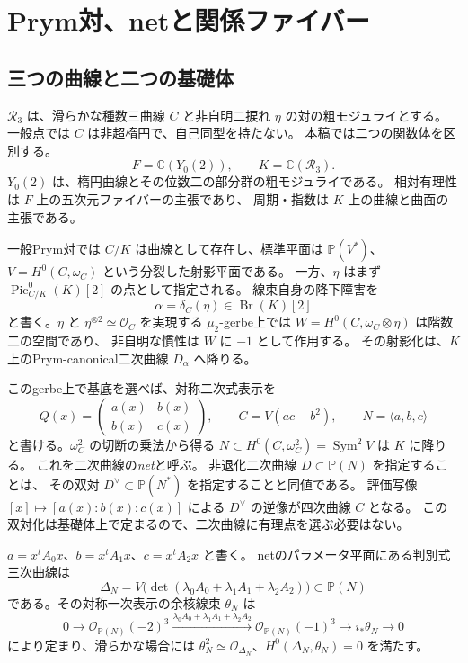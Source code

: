 \section{Prym対、netと関係ファイバー}
\label{sec:vi-setup-v28}

\subsection{三つの曲線と二つの基礎体}

$\mathcal R_3$ は、滑らかな種数三曲線 $C$ と非自明二捩れ
$\eta$ の対の粗モジュライとする。一般点では $C$ は非超楕円で、自己同型を持たない。
本稿では二つの関数体を区別する。
\[
 F=\mathbb C(Y_0(2)),\qquad K=\mathbb C(\mathcal R_3).
\]
$Y_0(2)$ は、楕円曲線とその位数二の部分群の粗モジュライである。
相対有理性は $F$ 上の五次元ファイバーの主張であり、
周期・指数は $K$ 上の曲線と曲面の主張である。

一般Prym対では $C/K$ は曲線として存在し、標準平面は
$\mathbb P(V^*)$、$V=H^0(C,\omega_C)$ という分裂した射影平面である。
一方、$\eta$ はまず
$\operatorname{Pic}^0_{C/K}(K)[2]$ の点として指定される。
線束自身の降下障害を
\[
 \alpha=\delta_C(\eta)\in\operatorname{Br}(K)[2]
\]
と書く。$\eta$ と $\eta^{\otimes2}\simeq\mathcal O_C$ を実現する
$\mu_2$-gerbe上では
$W=H^0(C,\omega_C\otimes\eta)$ は階数二の空間であり、
非自明な慣性は $W$ に $-1$ として作用する。
その射影化は、$K$ 上のPrym-canonical二次曲線 $D_\alpha$ へ降りる。

このgerbe上で基底を選べば、対称二次式表示を
\begin{equation}\label{eq:vi-symmetric-representation-v28}
 Q(x)=\begin{pmatrix}a(x)&b(x)\\ b(x)&c(x)\end{pmatrix},
 \qquad C=V(ac-b^2),
 \qquad N=\langle a,b,c\rangle
\end{equation}
と書ける。$\omega_C^2$ の切断の乗法から得る
$N\subset H^0(C,\omega_C^2)=\operatorname{Sym}^2V$ は $K$ に降りる。
これを二次曲線の\emph{net}と呼ぶ。
非退化二次曲線 $D\subset\mathbb P(N)$ を指定することは、
その双対 $D^\vee\subset\mathbb P(N^*)$ を指定することと同値である。
評価写像 $[x]\mapsto[a(x):b(x):c(x)]$ による $D^\vee$ の逆像が四次曲線 $C$ となる。
この双対化は基礎体上で定まるので、二次曲線に有理点を選ぶ必要はない。

$a=x^tA_0x$、$b=x^tA_1x$、$c=x^tA_2x$ と書く。
netのパラメータ平面にある判別式三次曲線は
\[
 \Delta_N=V\bigl(\det(\lambda_0A_0+\lambda_1A_1+\lambda_2A_2)\bigr)
 \subset\mathbb P(N)
\]
である。その対称一次表示の余核線束 $\theta_N$ は
\[
 0\to\mathcal O_{\mathbb P(N)}(-2)^3
 \xrightarrow{\lambda_0A_0+\lambda_1A_1+\lambda_2A_2}
 \mathcal O_{\mathbb P(N)}(-1)^3\to i_*\theta_N\to0
\]
により定まり、滑らかな場合には
$\theta_N^2\simeq\mathcal O_{\Delta_N}$、$H^0(\Delta_N,\theta_N)=0$ を満たす。

